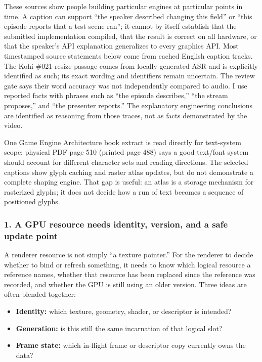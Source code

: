 These sources show people building particular engines at particular points in time. A caption can support ``the speaker described changing this field'' or ``this episode reports that a test scene ran''; it cannot by itself establish that the submitted implementation compiled, that the result is correct on all hardware, or that the speaker's API explanation generalizes to every graphics API. Most timestamped source statements below come from cached English caption tracks. The Kohi \#021 resize passage comes from locally generated ASR and is explicitly identified as such; its exact wording and identifiers remain uncertain. The review gate says their word accuracy was not independently compared to audio. I use reported facts with phrases such as ``the episode describes,'' ``the stream proposes,'' and ``the presenter reports.'' The explanatory engineering conclusions are identified as reasoning from those traces, not as facts demonstrated by the video.

One Game Engine Architecture book extract is read directly for text-system scope: physical PDF page 510 (printed page 488) says a good text/font system should account for different character sets and reading directions. The selected captions show glyph caching and raster atlas updates, but do not demonstrate a complete shaping engine. That gap is useful: an atlas is a storage mechanism for rasterized glyphs; it does not decide how a run of text becomes a sequence of positioned glyphs.

\subsubsection{1. A GPU resource needs identity, version, and a safe update point}\label{a-gpu-resource-needs-identity-version-and-a-safe-update-point}

A renderer resource is not simply ``a texture pointer.'' For the renderer to decide whether to bind or refresh something, it needs to know which logical resource a reference names, whether that resource has been replaced since the reference was recorded, and whether the GPU is still using an older version. Three ideas are often blended together:

\begin{itemize}
\tightlist
\item
  \textbf{Identity:} which texture, geometry, shader, or descriptor is intended?
\item
  \textbf{Generation:} is this still the same incarnation of that logical slot?
\item
  \textbf{Frame state:} which in-flight frame or descriptor copy currently owns the data?
\end{itemize}

